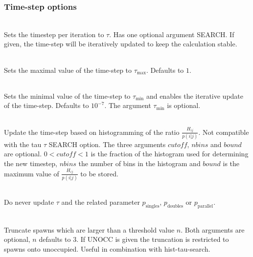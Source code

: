 \documentclass[a4paper,notitlepage]{scrreprt}
\newcommand\codeitem[1]{\needspace{1.5\baselineskip}\item[\textnormal{\ttfamily #1 \nopagebreak}] \hfill \\ \nopagebreak}
\begin{document}
  \subsubsection{Time-step options}
  \begin{description}
    \codeitem{tau $\tau$ SEARCH}
    Sets the timestep per iteration to $\tau$. Has one optional argument
    SEARCH. If given, the time-step will be iteratively updated to keep the
    calculation stable.
    \codeitem{max-tau $\tau_\text{max}$}
    Sets the maximal value of the time-step to $\tau_\text{max}$. Defaults to $1$.
    \codeitem{min-tau $\tau_\text{min}$}
    Sets the minimal value of the time-step to $\tau_\text{min}$ and enables
    the iterative update of the time-step. Defaults to
    $10^{-7}$. The argument $\tau_\text{min}$ is optional.
    \codeitem{hist-tau-search $cutoff$ $nbins$ $bound$}
    Update the time-step based on histogramming of the ratio
    $\frac{H_{ij}}{p(i|j)}$. Not compatible with the tau $\tau$ SEARCH
    option. The three arguments $cutoff$, $nbins$ and $bound$ are
    optional. $0<cutoff<1$ is the fraction of the histogram used for determining
    the new timestep, $nbins$ the number of bins in the histogram and $bound$
    is the maximum value of $\frac{H_{ij}}{p(i|j)}$ to be stored.
    \codeitem{keeptaufixed}
    Do never update $\tau$ and the related parameter $p_\text{singles}$,
    $p_\text{doubles}$ or $p_\text{parallel}$.
    \codeitem{truncate-spawns $n$ UNOCC}
    Truncate spawns which are larger than a threshold value $n$. Both
    arguments are optional, $n$ defaults to $3$. If UNOCC is given the
    truncation is restricted to spawns onto unoccupied. Useful in combination
    with hist-tau-search.
  \end{description}
\end{document}
